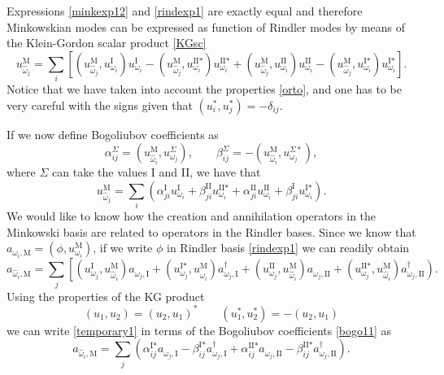 Expressions \eqref{minkexp12} and \eqref{rindexp1} are exactly equal and therefore Minkowskian modes can be expressed as function of Rindler modes by means of the Klein-Gordon scalar product \eqref{KGsc}
\begin{equation}
u_{\hat\omega_j}^\text{M}=\sum_i\left[(u_{\hat\omega_j}^\text{M},u_{\omega_i}^\text{I})u_{\omega_i}^\text{I}-
(u_{\hat\omega_j}^{\text{M}},u_{\omega_i}^{\text{II}*})u_{\omega_i}^\text{II*}+(u_{\hat\omega_j}^\text{M},u_{\omega_i}^\text{II})
u_{\omega_i}^\text{II}-(u_{\hat\omega_j}^{\text{M}},u_{\omega_i}^{\text{I}*})u_{\omega_i}^\text{I*}\right].
\end{equation}
Notice that we have taken into account the properties \eqref{orto}, and one has to be very careful with the signs given that $(u^*_i,u^*_j)=-\delta_{ij}$.

If we now define Bogoliubov coefficients as
\begin{equation}\label{bogo11}
\alpha^{\Sigma}_{ij}=\left(u_{\hat\omega_i}^{\text{M}},u_{\omega_j}^\Sigma\right),
\qquad\beta^{\Sigma}_{ij}=-\left(u_{\hat\omega_i}^{\text{M}},u_{\omega_j}^{\Sigma*}\right),
\end{equation}
where $\Sigma$ can take the values I and II, we have that
\begin{equation}\label{minkowskirindlerexp}
u_{\hat\omega_j}^\text{M}=\sum_i\left(\alpha^{\text{I}}_{ji}u_{\omega_i}^\text{I}+
\beta^{\text{II}}_{ji}u_{\omega_i}^\text{II*}+\alpha^{\text{II}}_{ji}
u_{\omega_i}^\text{II}+\beta^{\text{I}}_{ji}u_{\omega_i}^\text{I*}\right).
\end{equation}
We would like to know how the creation and annihilation operators in the Minkowski basis are related to operators in the Rindler bases. Since we know that $a_{\omega_i,\text{M}}=(\phi,u_{\omega_i}^\text{M})$, if we write $\phi$ in Rindler basis \eqref{rindexp1} we can readily obtain
\begin{equation}\label{temporary1}
a_{\hat\omega_i,\text{M}}=\sum_j\left[(u_{\omega_j}^\text{I},u_{\hat\omega_i}^\text{M})
a^{\phantom{\dagger}}_{\omega_j,\text{I}}+(u_{\omega_j}^{\text{I}*},u_{\hat\omega_i}^\text{M})
a^\dagger_{\omega_j,\text{I}}+(u_{\omega_j}^\text{II},u_{\hat\omega_i}^\text{M})
a^{\phantom{\dagger}}_{\omega_j,\text{II}}+(u_{\omega_j}^{\text{II}*},u_{\hat\omega_i}^\text{M})
a^\dagger_{\omega_j,\text{II}}\right).
\end{equation}
Using the properties of the KG product
\begin{equation}\label{KGproperties}(u_1,u_2)=(u_2,u_1)^*\qquad(u_1^*,u_2^*)=-(u_2,u_1)\end{equation}
we can write \eqref{temporary1} in terms of the Bogoliubov coefficients \eqref{bogo11} as 
\begin{equation}
a_{\hat\omega_i,\text{M}}=\sum_j\left(\alpha^{\text{I}*}_{ij}
a^{\phantom{\dagger}}_{\omega_j,\text{I}}-\beta^{\text{I}*}_{ij}
a^\dagger_{\omega_j,\text{I}}+\alpha^{\text{II}*}_{ij}
a^{\phantom{\dagger}}_{\omega_j,\text{II}}-\beta^{\text{II}*}_{ij}
a^\dagger_{\omega_j,\text{II}}\right).
\end{equation}

